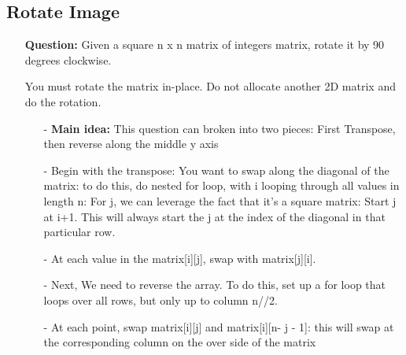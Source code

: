 \documentclass[12pt]{article}
\begin{document}
\subsection{Rotate Image}
\begin{enumerate}
  \item[] \textbf{Question:} Given a square n x n matrix of integers matrix, rotate it by 90 degrees clockwise.

You must rotate the matrix in-place. Do not allocate another 2D matrix and do the rotation.

    \begin{enumerate}
      \item[-] \textbf{Main idea:} This question can broken into two pieces: First Transpose, then reverse along the middle y axis
      \item[-] Begin with the transpose: You want to swap along the diagonal of the matrix: to do this, do nested for loop, with i looping through all values in length n: For j, we can leverage the fact that it's a square matrix: Start j at i+1. This will always start the j at the index of the diagonal in that particular row.
      \item[-] At each value in the matrix[i][j], swap with matrix[j][i].
      \item[-] Next, We need to reverse the array. To do this, set up a for loop that loops over all rows, but only up to column n//2. 
      \item[-] At each point, swap matrix[i][j] and matrix[i][n- j - 1]: this will swap at the corresponding column on the over side of the matrix

    \end{enumerate}
\end{enumerate}
\end{document}
